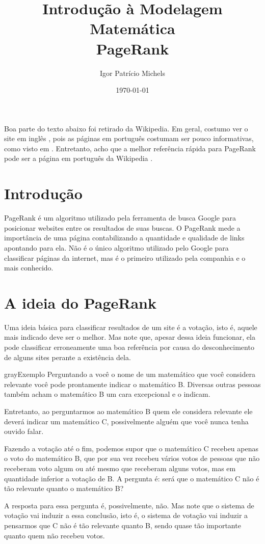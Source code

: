 \documentclass{article}
\begin{document}
\title{Introdução à Modelagem Matemática \\ PageRank}
\author{Igor Patrício Michels}
\date{\today}
\maketitle

Boa parte do texto abaixo foi retirado da Wikipedia. Em geral, costumo ver o site em inglês \cite{wiki}, pois as páginas em português costumam ser pouco informativas, como visto em \cite{wiki3}. Entretanto, acho que a melhor referência rápida para PageRank pode ser a página em português da Wikipedia \cite{wiki2}.

\section*{Introdução}

PageRank é um algoritmo utilizado pela ferramenta de busca Google para posicionar websites entre os resultados de suas buscas. O PageRank mede a importância de uma página contabilizando a quantidade e qualidade de links apontando para ela. Não é o único algoritmo utilizado pelo Google para classificar páginas da internet, mas é o primeiro utilizado pela companhia e o mais conhecido.

\section*{A ideia do PageRank}

Uma ideia básica para classificar resultados de um site é a votação, isto é, aquele mais indicado deve ser o melhor. Mas note que, apesar dessa ideia funcionar, ela pode classificar erroneamente uma boa referência por causa do desconhecimento de alguns sites perante a existência dela.
\begin{mybox}{gray}{Exemplo}
    Perguntando a você o nome de um matemático que você considera relevante você pode prontamente indicar o matemático B. Diversas outras pessoas também acham o matemático B um cara excepcional e o indicam.
    
    Entretanto, ao perguntarmos ao matemático B quem ele considera relevante ele deverá indicar um matemático C, possivelmente alguém que você nunca tenha ouvido falar.
    
    Fazendo a votação até o fim, podemos supor que o matemático C recebeu apenas o voto do matemático B, que por sua vez recebeu vários votos de pessoas que não receberam voto algum ou até mesmo que receberam alguns votos, mas em quantidade inferior a votação de B. A pergunta é: será que o matemático C não é tão relevante quanto o matemático B?
    
    A resposta para essa pergunta é, possivelmente, não. Mas note que o sistema de votação vai induzir a essa conclusão, isto é, o sistema de votação vai induzir a pensarmos que C não é tão relevante quanto B, sendo quase tão importante quanto quem não recebeu votos.
\end{mybox}
\end{document}
